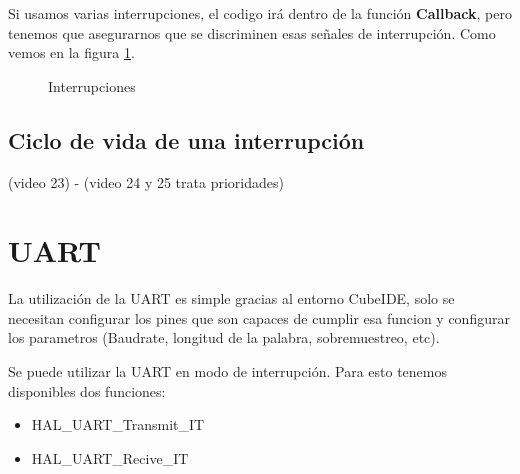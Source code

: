 \documentclass[a4paper,12pt]{report} %
\begin{document}
Si usamos varias interrupciones, el codigo irá dentro de la función \textbf{Callback}, pero tenemos que asegurarnos que se discriminen esas señales de interrupción. Como vemos en la figura \ref{interrupt}.

\begin{figure}[H]
	\centering
	\caption{Interrupciones}
	\label{interrupt}
\end{figure}

\subsection{Ciclo de vida de una interrupción}
(video 23) - (video 24 y 25 trata prioridades)


\section{UART}

La utilización de la UART es simple gracias al entorno CubeIDE, solo se necesitan configurar los pines que son capaces de cumplir esa funcion y configurar los parametros (Baudrate, longitud de la palabra, sobremuestreo, etc).

Se puede utilizar la UART en modo de interrupción. Para esto tenemos disponibles dos funciones: 


\begin{itemize}
	\item HAL\_UART\_Transmit\_IT
	\item HAL\_UART\_Recive\_IT
\end{itemize}
\end{document}
